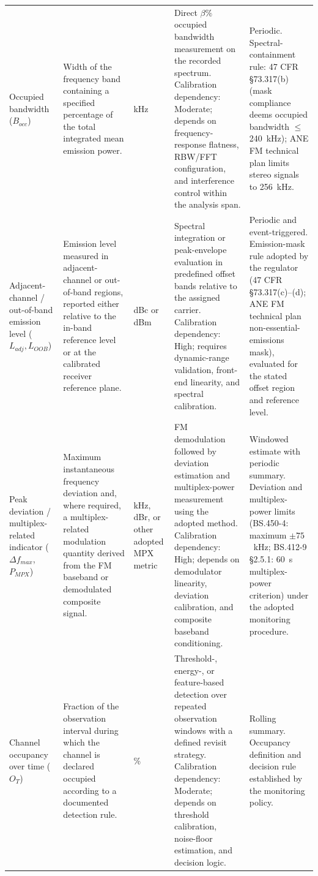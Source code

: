 \documentclass[11pt]{article}
\begin{document}
\begin{longtable}{L{2.4cm}L{3.6cm}L{1.5cm}L{4.0cm}L{2.9cm}}
Occupied bandwidth ($B_{occ}$) &
Width of the frequency band containing a specified percentage of the total integrated mean emission power. &
kHz &
Direct $\beta\%$ occupied bandwidth measurement on the recorded spectrum. Calibration dependency: Moderate; depends on frequency-response flatness, RBW/FFT configuration, and interference control within the analysis span. &
Periodic. Spectral-containment rule: 47 CFR \S73.317(b) (mask compliance deems occupied bandwidth $\le$240~kHz); ANE FM technical plan limits stereo signals to 256~kHz. \\

Adjacent-channel / out-of-band emission level ($L_{adj}, L_{OOB}$) &
Emission level measured in adjacent-channel or out-of-band regions, reported either relative to the in-band reference level or at the calibrated receiver reference plane. &
dBc or dBm &
Spectral integration or peak-envelope evaluation in predefined offset bands relative to the assigned carrier. Calibration dependency: High; requires dynamic-range validation, front-end linearity, and spectral calibration. &
Periodic and event-triggered. Emission-mask rule adopted by the regulator (47 CFR \S73.317(c)--(d); ANE FM technical plan non-essential-emissions mask), evaluated for the stated offset region and reference level. \\

Peak deviation / multiplex-related indicator ($\Delta f_{max}$, $P_{MPX}$) &
Maximum instantaneous frequency deviation and, where required, a multiplex-related modulation quantity derived from the FM baseband or demodulated composite signal. &
kHz, dBr, or other adopted MPX metric &
FM demodulation followed by deviation estimation and multiplex-power measurement using the adopted method. Calibration dependency: High; depends on demodulator linearity, deviation calibration, and composite baseband conditioning. &
Windowed estimate with periodic summary. Deviation and multiplex-power limits (BS.450-4: maximum $\pm 75$~kHz; BS.412-9 \S2.5.1: 60~s multiplex-power criterion) under the adopted monitoring procedure. \\

Channel occupancy over time ($O_T$) &
Fraction of the observation interval during which the channel is declared occupied according to a documented detection rule. &
\% &
Threshold-, energy-, or feature-based detection over repeated observation windows with a defined revisit strategy. Calibration dependency: Moderate; depends on threshold calibration, noise-floor estimation, and decision logic. &
Rolling summary. Occupancy definition and decision rule established by the monitoring policy. \\

\end{longtable}
\end{document}
